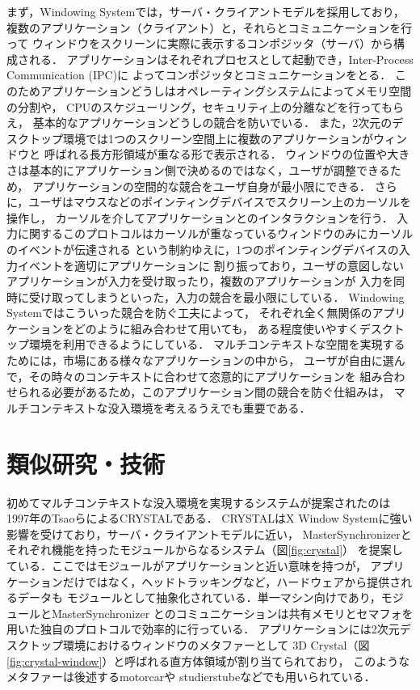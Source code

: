 まず，Windowing Systemでは，サーバ・クライアントモデルを採用しており，
複数のアプリケーション（クライアント）と，それらとコミュニケーションを行って
ウィンドウをスクリーンに実際に表示するコンポジッタ（サーバ）から構成される．
アプリケーションはそれぞれプロセスとして起動でき，Inter-Process Communication (IPC)に
よってコンポジッタとコミュニケーションをとる．
このためアプリケーションどうしはオペレーティングシステムによってメモリ空間の分割や，
CPUのスケジューリング，セキュリティ上の分離などを行ってもらえ，
基本的なアプリケーションどうしの競合を防いでいる．
また，2次元のデスクトップ環境では1つのスクリーン空間上に複数のアプリケーションがウィンドウと
呼ばれる長方形領域が重なる形で表示される．
ウィンドウの位置や大きさは基本的にアプリケーション側で決めるのではなく，ユーザが調整できるため，
アプリケーションの空間的な競合をユーザ自身が最小限にできる．
さらに，ユーザはマウスなどのポインティングデバイスでスクリーン上のカーソルを操作し，
カーソルを介してアプリケーションとのインタラクションを行う．
入力に関するこのプロトコルはカーソルが重なっているウィンドウのみにカーソルのイベントが伝達される
という制約ゆえに，1つのポインティングデバイスの入力イベントを適切にアプリケーションに
割り振っており，ユーザの意図しないアプリケーションが入力を受け取ったり，複数のアプリケーションが
入力を同時に受け取ってしまうといった，入力の競合を最小限にしている．
Windowing Systemではこういった競合を防ぐ工夫によって，
それぞれ全く無関係のアプリケーションをどのように組み合わせて用いても，
ある程度使いやすくデスクトップ環境を利用できるようにしている．
マルチコンテキストな空間を実現するためには，市場にある様々なアプリケーションの中から，
ユーザが自由に選んで，その時々のコンテキストに合わせて恣意的にアプリケーションを
組み合わせられる必要があるため，このアプリケーション間の競合を防ぐ仕組みは，
マルチコンテキストな没入環境を考えるうえでも重要である．

\section{類似研究・技術}
\label{section:overview:related-work}

初めてマルチコンテキストな没入環境を実現するシステムが提案されたのは
1997年のTsaoらによるCRYSTAL\cite{crystal}である．
CRYSTALはX Window Systemに強い影響を受けており，サーバ・クライアントモデルに近い，
MasterSynchronizerとそれぞれ機能を持ったモジュールからなるシステム（図\ref{fig:crystal}）
を提案している．ここではモジュールがアプリケーションと近い意味を持つが，
アプリケーションだけではなく，ヘッドトラッキングなど，ハードウェアから提供されるデータも
モジュールとして抽象化されている．単一マシン向けであり，モジュールとMasterSynchronizer
とのコミュニケーションは共有メモリとセマフォを用いた独自のプロトコルで効率的に行っている．
アプリケーションには2次元デスクトップ環境におけるウィンドウのメタファーとして
3D Crystal（図\ref{fig:crystal-window}）と呼ばれる直方体領域が割り当てられており，
このようなメタファーは後述するmotorcar\cite{reiling}や
studierstube\cite{studierstube}などでも用いられている．

